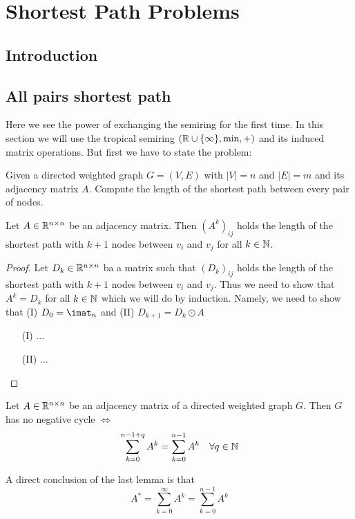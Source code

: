 \chapter{Shortest Path Problems}
\section{Introduction}
\section{All pairs shortest path}
Here we see the power of exchanging the semiring for the first time. In this section we will use the tropical semiring $(\mathbb{R} \cup \{\infty\}, \min, +)$ and its induced matrix operations. But first we have to state the problem:
\begin{problem} 
    Given a directed weighted graph $G = (V, E)$ with $|V| = n$ and $|E| = m$ and its adjacency matrix $A$. Compute the length of the shortest path between every pair of nodes.
\end{problem}

\begin{lemma}
    Let $A \in \mathbb{R}^{n \times n}$ be an adjacency matrix. Then $(A^k)_{ij}$ holds the length of the shortest path with $k+1$ nodes between $v_i$ and $v_j$ for all $k \in \mathbb{N}$. 
\end{lemma}
\begin{proof}
    Let $D_k \in \mathbb{R}^{n \times n}$ ba a matrix such that $(D_k)_{ij}$ holds the length of the shortest path with $k+1$ nodes between $v_i$ and $v_j$. Thus we need to show that $A^k = D_k$ for all $k \in \mathbb{N}$ which we will do by induction. Namely, we need to show that (I) $D_0 = \imat_n$ and (II) $D_{k+1} = D_k \odot A$
    \begin{enumerate}
        \item[(I)] ...
        \item[(II)] ...
    \end{enumerate}
\end{proof}

\begin{lemma}
    Let $A \in \mathbb{R}^{n \times n}$ be an adjacency matrix of a directed weighted graph $G$. Then $G$ has no negative cycle $\Leftrightarrow$ 
    $$\sum_{k=0}^{n-1+q} A^k = \sum_{k=0}^{n-1} A^k \quad\forall q \in \mathbb{N}$$
\end{lemma}

\begin{corollary}
    A direct conclusion of the last lemma is that
    $$A^* = \sum_{k=0}^{\infty}A^k = \sum_{k=0}^{n-1}A^k$$
\end{corollary}

